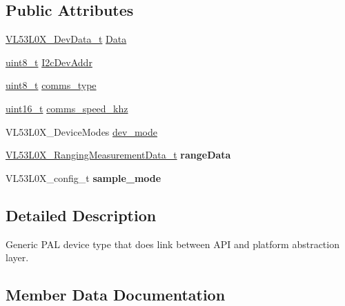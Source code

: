 \subsection*{Public Attributes}
\begin{DoxyCompactItemize}
\item 
\hyperlink{structVL53L0X__DevData__t}{V\+L53\+L0\+X\+\_\+\+Dev\+Data\+\_\+t} \hyperlink{structVL53L0X__Dev__t_ab69036a33cb4bfdf295d53e1ab15ff54}{Data}
\item 
\hyperlink{vl53l0x__types_8h_aba7bc1797add20fe3efdf37ced1182c5}{uint8\+\_\+t} \hyperlink{structVL53L0X__Dev__t_add69f3fe32d5d1fc063133763a282e2c}{I2c\+Dev\+Addr}
\item 
\hyperlink{vl53l0x__types_8h_aba7bc1797add20fe3efdf37ced1182c5}{uint8\+\_\+t} \hyperlink{structVL53L0X__Dev__t_ad31ab98c8e3f4461d322f1089430e714}{comms\+\_\+type}
\item 
\hyperlink{vl53l0x__types_8h_a273cf69d639a59973b6019625df33e30}{uint16\+\_\+t} \hyperlink{structVL53L0X__Dev__t_a7aff2b204283beb1e5a73f887c8cceb9}{comms\+\_\+speed\+\_\+khz}
\item 
V\+L53\+L0\+X\+\_\+\+Device\+Modes \hyperlink{structVL53L0X__Dev__t_a1a823e2387e3fa81bae5a1412ed52384}{dev\+\_\+mode}
\item 
\mbox{\label{structVL53L0X__Dev__t_aa1773c06fb519cdcc3391fd213e015e5}} 
\hyperlink{structVL53L0X__RangingMeasurementData__t}{V\+L53\+L0\+X\+\_\+\+Ranging\+Measurement\+Data\+\_\+t} {\bfseries range\+Data}
\item 
\mbox{\label{structVL53L0X__Dev__t_a3dea4228d57eaf99d536f800984b98d6}} 
V\+L53\+L0\+X\+\_\+config\+\_\+t {\bfseries sample\+\_\+mode}
\end{DoxyCompactItemize}


\subsection{Detailed Description}
Generic P\+AL device type that does link between A\+PI and platform abstraction layer. 

\subsection{Member Data Documentation}
\mbox{\label{structVL53L0X__Dev__t_a7aff2b204283beb1e5a73f887c8cceb9}} 

